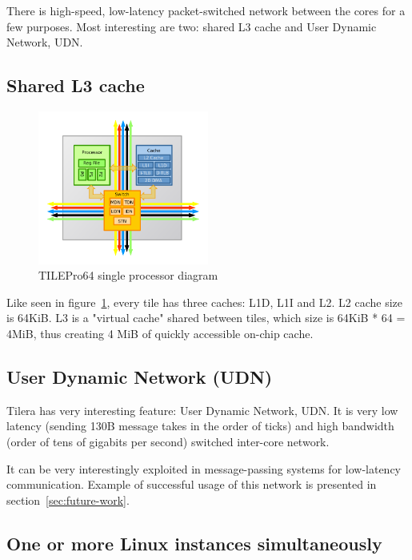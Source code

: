 \documentclass[english,11pt]{l4proj}
\begin{document}
There is high-speed, low-latency packet-switched network between the cores for a
few purposes. Most interesting are two: shared L3 cache and User Dynamic
Network, UDN.

\subsection{Shared L3 cache}

\begin{figure}[htb]
    \centering
    \includegraphics[width=0.5\textwidth]{images/tile64_cpu.pdf}
    \caption{TILEPro64 single processor diagram\cite{tilepro64-diagram}}
    \label{fig:tile64_cpu}
\end{figure}

Like seen in figure~\ref{fig:tile64_cpu}, every tile has three caches: L1D, L1I
and L2. L2 cache size is 64KiB. L3 is a "virtual cache" shared between tiles,
which size is 64KiB * 64 = 4MiB, thus creating 4 MiB of quickly accessible
on-chip cache.

\subsection{User Dynamic Network (UDN)}

Tilera has very interesting feature: User Dynamic Network, UDN. It is very low
latency (sending 130B message takes in the order of ticks) and high bandwidth
(order of tens of gigabits per second) switched inter-core network.

It can be very interestingly exploited in message-passing systems for
low-latency communication. Example of successful usage of this network is
presented in section~\ref{sec:future-work}.

\subsection{One or more Linux instances simultaneously}
\end{document}
